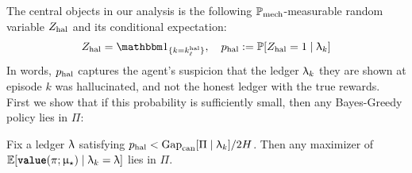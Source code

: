 The central objects in our analysis is the following $\mathbb{P}_{\mathrm{mech}}$-measurable random variable $Z_{\mathrm{hal}}$ and its conditional expectation:
\begin{align}
\Zhal = \ind_{\{k = \kexpl\}}, \quad \phal := \Pr[\Zhal = 1\mid \ledger_k]
\end{align}
In words, $p_{\mathrm{hal}}$ captures the  agent's suspicion that the ledger $\uplambda_k$ they are shown at episode $k$ was hallucinated, and not the honest ledger with the true rewards. First we show that if this probability is sufficiently small, then any Bayes-Greedy policy lies in $\Pi$:
\begin{claim}\label{claim:phal_gap} Fix a ledger $\uplambda$ satisfying $p_{\mathrm{hal}} < \mathrm{Gap}_{\mathrm{can}}[\Pi \mid \uplambda_k ]/2H$. Then any maximizer of $\mathbb{E}[{\normalfont \texttt{\textbf{value}}}(\pi;\upmu_{\star}) \mid  \uplambda_k = \uplambda]$ lies in $\Pi$.
\end{claim}
